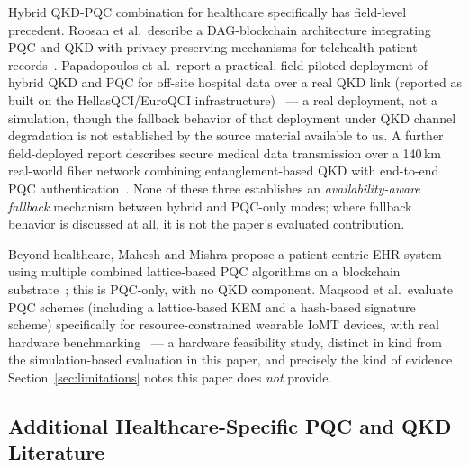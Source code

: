 \documentclass[journal]{IEEEtran}
\begin{document}
Hybrid QKD-PQC combination for healthcare specifically has field-level precedent. Roosan et al.\ describe a DAG-blockchain architecture integrating PQC and QKD with privacy-preserving mechanisms for telehealth patient records~\cite{roosan2025pqctelehealth}. Papadopoulos et al.\ report a practical, field-piloted deployment of hybrid QKD and PQC for off-site hospital data over a real QKD link (reported as built on the HellasQCI/EuroQCI infrastructure)~\cite{papadopoulos2026hybriddeployment} --- a real deployment, not a simulation, though the fallback behavior of that deployment under QKD channel degradation is not established by the source material available to us. A further field-deployed report describes secure medical data transmission over a 140\,km real-world fiber network combining entanglement-based QKD with end-to-end PQC authentication~\cite{anon2026securemedical}. None of these three establishes an \emph{availability-aware fallback} mechanism between hybrid and PQC-only modes; where fallback behavior is discussed at all, it is not the paper's evaluated contribution.

Beyond healthcare, Mahesh and Mishra propose a patient-centric EHR system using multiple combined lattice-based PQC algorithms on a blockchain substrate~\cite{mahesh2025pcbqc}; this is PQC-only, with no QKD component. Maqsood et al.\ evaluate PQC schemes (including a lattice-based KEM and a hash-based signature scheme) specifically for resource-constrained wearable IoMT devices, with real hardware benchmarking~\cite{maqsood2025enhancing} --- a hardware feasibility study, distinct in kind from the simulation-based evaluation in this paper, and precisely the kind of evidence Section~\ref{sec:limitations} notes this paper does \emph{not} provide.

\subsection{Additional Healthcare-Specific PQC and QKD Literature}
\end{document}

